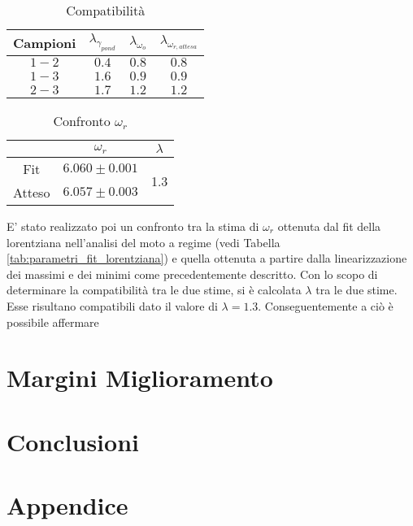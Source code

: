 \documentclass[a4paper,11pt,oneside]{article}
\begin{document}
\begin{table}[h!]
    \centering
    \begin{tabular}{|c|c|c|c|}
    \hline
        Campioni & $\lambda_{\gamma_{pond}}$ & $\lambda_{\omega_o}$ & $\lambda_{\omega_{r,attesa}}$\\ \hline
        \rowcolor[rgb]{0.85,0.85,0.85}$1-2$ & $0.4$ & $0.8$ & $0.8$ \\ \hline
        $1-3$ & $1.6$ & $0.9$ & $0.9$ \\ \hline
        \rowcolor[rgb]{0.85,0.85,0.85}$2-3$ & $1.7$ & $1.2$ & $1.2$ \\ \hline
    \end{tabular}
    \caption{Compatibilità}
    \label{tab:comp_gamma_omega}
\end{table}


\begin{wraptable}{r}{5cm}
    \centering
    \begin{tabular}{c|c|c|}
        \cline{2-3}
        & $\omega_{r}$ & $\lambda$ \\ \hline
        \multicolumn{1}{|c|}{Fit} & $6.060\pm0.001$ & \multirow{2}{*}{1.3} \\ \cline{1-2}
        \multicolumn{1}{|c|}{Atteso} & $6.057\pm0.003$ &\\ \hline
    \end{tabular}
    \caption{Confronto $\omega_{r}$}
    \label{tab:confronto_omega_r}
\end{wraptable}
E' stato realizzato poi un confronto tra la stima di $\omega_{r}$ ottenuta dal fit della lorentziana nell'analisi del moto a regime (vedi Tabella \ref{tab:parametri_fit_lorentziana}) e quella ottenuta a partire dalla linearizzazione dei massimi e dei minimi come precedentemente descritto. Con lo scopo di determinare la compatibilità tra le due stime, si è calcolata $\lambda$ tra le due stime. Esse risultano compatibili dato il valore di $\lambda = 1.3$. Conseguentemente a ciò è possibile affermare 




\section{Margini Miglioramento}

\section{Conclusioni}


\section{Appendice}
\end{document}
